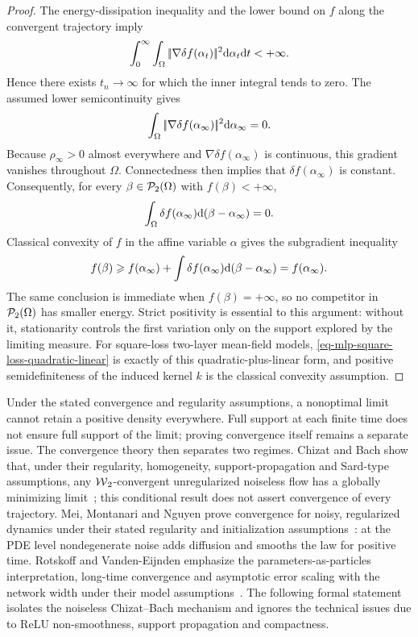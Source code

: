 \begin{proof}
	The energy-dissipation inequality and the lower bound on $f$ along the convergent trajectory imply
	\[
		\int_0^\infty
		\int_\Omega|\!| \nabla\delta f(\alpha_t) |\!|^2\mathrm{d}\alpha_t\mathrm{d} t
		<+\infty.
	\]
	Hence there exists $t_n\to\infty$ for which the inner integral tends to zero. The assumed lower semicontinuity gives
	\[
		\int_\Omega |\!| \nabla \delta f(\alpha_\infty) |\!|^2\mathrm{d}\alpha_\infty=0.
	\]
	Because $\rho_\infty>0$ almost everywhere and $\nabla\delta f(\alpha_\infty)$ is continuous, this gradient vanishes throughout $\Omega$. Connectedness then implies that $\delta f(\alpha_\infty)$ is constant. Consequently, for every $\beta\in\mathcal{P}_2(\Omega)$ with $f(\beta)<+\infty$,
	\[
		\int_\Omega\delta f(\alpha_\infty)\mathrm{d}(\beta-\alpha_\infty)=0.
	\]
	Classical convexity of $f$ in the affine variable $\alpha$ gives the subgradient inequality
	\[
		f(\beta)\geqslant f(\alpha_\infty)
		+
		\int \delta f(\alpha_\infty)\mathrm{d}(\beta-\alpha_\infty)
		= f(\alpha_\infty).
	\]
	The same conclusion is immediate when $f(\beta)=+\infty$, so no competitor in $\mathcal{P}_2(\Omega)$ has smaller energy. Strict positivity is essential to this argument: without it, stationarity controls the first variation only on the support explored by the limiting measure. For square-loss two-layer mean-field models, \eqref{eq-mlp-square-loss-quadratic-linear} is exactly of this quadratic-plus-linear form, and positive semidefiniteness of the induced kernel $k$ is the classical convexity assumption.
\end{proof}

Under the stated convergence and regularity assumptions, a nonoptimal limit cannot retain a positive density everywhere. Full support at each finite time does not ensure full support of the limit; proving convergence itself remains a separate issue. The convergence theory then separates two regimes. Chizat and Bach show that, under their regularity, homogeneity, support-propagation and Sard-type assumptions, any $\operatorname{\mathcal{W}}_2$-convergent unregularized noiseless flow has a globally minimizing limit~\cite{ChizatBach2018OverparameterizedOT}; this conditional result does not assert convergence of every trajectory. Mei, Montanari and Nguyen prove convergence for noisy, regularized dynamics under their stated regularity and initialization assumptions~\cite{MeiMontanariNguyen2018MeanFieldNN}: at the PDE level nondegenerate noise adds diffusion and smooths the law for positive time. Rotskoff and Vanden-Eijnden emphasize the parameters-as-particles interpretation, long-time convergence and asymptotic error scaling with the network width under their model assumptions~\cite{RotskoffVandenEijnden2018Trainability}. The following formal statement isolates the noiseless Chizat--Bach mechanism and ignores the technical issues due to ReLU non-smoothness, support propagation and compactness.

